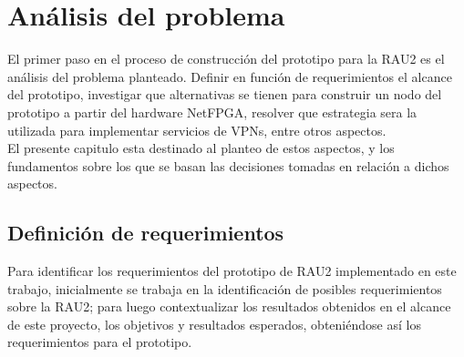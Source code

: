 \chapter{An\'alisis del problema}

\ifpdf
    \graphicspath{{Chapter3/Figs/Raster/}{Chapter3/Figs/PDF/}{Chapter3/Figs/}}
\else
    \graphicspath{{Chapter3/Figs/Vector/}{Chapter3/Figs/}}
\fi

El primer paso en el proceso de construcción del prototipo para la RAU2 es el análisis del problema planteado. Definir en función de requerimientos el alcance del prototipo, investigar que alternativas se tienen para construir un nodo del prototipo a partir del hardware NetFPGA, resolver que estrategia sera la utilizada para implementar servicios de VPNs, entre otros aspectos.\\

El presente capitulo esta destinado al planteo de estos aspectos, y los fundamentos sobre los que se basan las decisiones tomadas en relación a dichos aspectos. 




\section[Definición de requerimientos]{Definición de requerimientos}

Para identificar los requerimientos del prototipo de RAU2 implementado en este trabajo, inicialmente se trabaja en la identificación de posibles requerimientos sobre la RAU2; para luego contextualizar los resultados obtenidos en el alcance de este proyecto, los objetivos y resultados esperados, obteniéndose  así los requerimientos para el prototipo.\\

